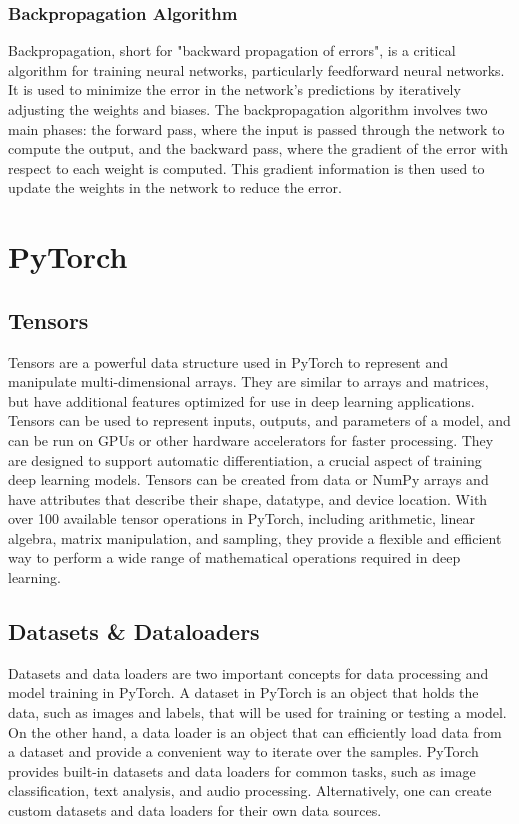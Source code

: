 \subsubsection{Backpropagation Algorithm}

Backpropagation, short for "backward propagation of errors", is a critical algorithm for training neural networks, particularly feedforward neural networks. It is used to minimize the error in the network's predictions by iteratively adjusting the weights and biases. The backpropagation algorithm involves two main phases: the forward pass, where the input is passed through the network to compute the output, and the backward pass, where the gradient of the error with respect to each weight is computed. This gradient information is then used to update the weights in the network to reduce the error.


\section{PyTorch}
\subsection{Tensors}

Tensors are a powerful data structure used in PyTorch to represent and manipulate multi-dimensional arrays.
They are similar to arrays and matrices, but have additional features optimized for use in deep learning applications.
Tensors can be used to represent inputs, outputs, and parameters of a model, and can be run on GPUs or other hardware accelerators for faster processing.
They are designed to support automatic differentiation, a crucial aspect of training deep learning models.
Tensors can be created from data or NumPy arrays and have attributes that describe their shape, datatype, and device location.
With over 100 available tensor operations in PyTorch, including arithmetic, linear algebra, matrix manipulation, and sampling, they provide a flexible and efficient way to perform a wide range of mathematical operations required in deep learning.


\subsection{Datasets \& Dataloaders}

Datasets and data loaders are two important concepts for data processing and model training in PyTorch.
A dataset in PyTorch is an object that holds the data, such as images and labels, that will be used for training or testing a model.
On the other hand, a data loader is an object that can efficiently load data from a dataset and provide a convenient way to iterate over the samples.
PyTorch provides built-in datasets and data loaders for common tasks, such as image classification, text analysis, and audio processing.
Alternatively, one can create custom datasets and data loaders for their own data sources.


